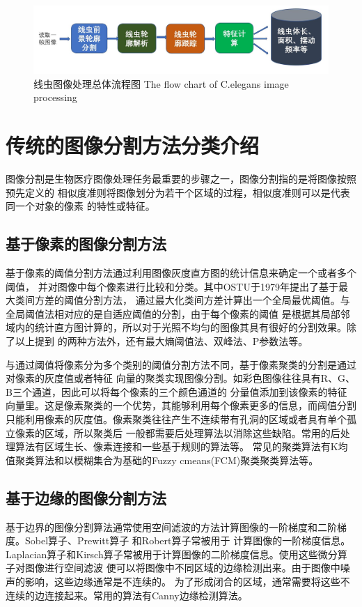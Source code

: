 	\begin{figure}[h]
	  \centering
	  \includegraphics[width=14cm]{figure/chap3/flow.jpg}
	  \bicaption
		{线虫图像处理总体流程图}
		{The flow chart of C.elegans image processing}
	  \label{fig:flow}
	\end{figure}
\section{传统的图像分割方法分类介绍}
	图像分割是生物医疗图像处理任务最重要的步骤之一，图像分割指的是将图像按照预先定义的
	相似度准则将图像划分为若干个区域的过程，相似度准则可以是代表同一个对象的像素
	的特性或特征。
\subsection{基于像素的图像分割方法}
	基于像素的阈值分割方法通过利用图像灰度直方图的统计信息来确定一个或者多个阈值，
	并对图像中每个像素进行比较和分类。其中OSTU于1979年提出了基于最大类间方差的阈值分割方法\cite{otsu1979threshold}，
	通过最大化类间方差计算出一个全局最优阈值。与全局阈值法相对应的是自适应阈值的分割，由于每个像素的阈值
	是根据其局部邻域内的统计直方图计算的，所以对于光照不均匀的图像其具有很好的分割效果。除了以上提到
	的两种方法外，还有最大熵阈值法、双峰法、P参数法等。
	
	与通过阈值将像素分为多个类别的阈值分割方法不同，基于像素聚类的分割是通过对像素的灰度值或者特征
	向量的聚类实现图像分割。如彩色图像往往具有R、G、B三个通道，因此可以将每个像素的三个颜色通道的
	分量值添加到该像素的特征向量里。这是像素聚类的一个优势，其能够利用每个像素更多的信息，而阈值分割
	只能利用像素的灰度值。像素聚类往往产生不连续带有孔洞的区域或者具有单个孤立像素的区域，所以聚类后
	一般都需要后处理算法以消除这些缺陷。常用的后处理算法有区域生长、像素连接和一些基于规则的算法等。
	常见的聚类算法有K均值聚类算法\cite{forgy1965cluster}和以模糊集合为基础的Fuzzy cmeans(FCM)聚类聚类算法\cite{evers1999fuzzy}等。
\subsection{基于边缘的图像分割方法}
	基于边界的图像分割算法通常使用空间滤波的方法计算图像的一阶梯度和二阶梯度。Sobel算子、Prewitt算子
	和Robert算子常被用于
	计算图像的一阶梯度信息。Laplacian算子和Kirsch算子常被用于计算图像的二阶梯度信息。使用这些微分算子对图像进行空间滤波
	便可以将图像中不同区域的边缘检测出来。由于图像中噪声的影响，这些边缘通常是不连续的。
	为了形成闭合的区域，通常需要将这些不连续的边连接起来。常用的算法有Canny边缘检测算法。
